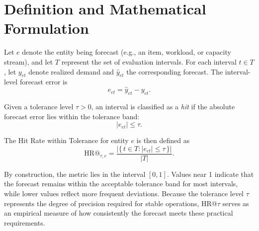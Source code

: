 \section{Definition and Mathematical Formulation}

Let \(e\) denote the entity being forecast (e.g., an item, workload, or capacity
stream), and let \(T\) represent the set of evaluation intervals. For each
interval \(t \in T\), let \(y_{et}\) denote realized demand and \(\hat{y}_{et}\)
the corresponding forecast. The interval-level forecast error is
\[
e_{et} = \hat{y}_{et} - y_{et}.
\]

Given a tolerance level \(\tau > 0\), an interval is classified as a
\emph{hit} if the absolute forecast error lies within the tolerance band:
\[
|e_{et}| \le \tau.
\]

The Hit Rate within Tolerance for entity \(e\) is then defined as
\[
\mathrm{HR@}_{\tau,e}
=
\frac{
\left| \{\, t \in T : |e_{et}| \le \tau \, \} \right|
}{
|T|
}.
\]

By construction, the metric lies in the interval \([0,1]\). Values near 1
indicate that the forecast remains within the acceptable tolerance band for most
intervals, while lower values reflect more frequent deviations. Because the
tolerance level \(\tau\) represents the degree of precision required for stable
operations, HR@\(\tau\) serves as an empirical measure of how consistently the
forecast meets these practical requirements.
